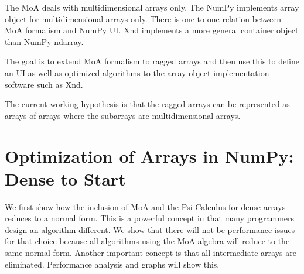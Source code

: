 \documentclass[a4paper,12pt]{article}
\begin{document}
The MoA deals with multidimensional arrays only.  The NumPy implements
array object for multidimensional arrays only. There is one-to-one
relation between MoA formalism and NumPy UI. Xnd implements a more
general container object than NumPy ndarray.

The goal is to extend MoA formalism to ragged arrays and then use this
to define an UI as well as optimized algorithms to the array object
implementation software such as Xnd. 

The current working hypothesis is that the ragged arrays can be
represented as arrays of arrays where the subarrays are
multidimensional arrays.

\section{Optimization of Arrays in NumPy: Dense to Start}
We first show how the inclusion of MoA and the Psi Calculus for dense arrays
reduces to a normal form. This is a powerful concept in that many programmers design an algorithm different. We show that there will not be performance issues for that choice because all algorithms using the MoA algebra will reduce to the same normal form. Another important concept is that all intermediate arrays are eliminated. Performance analysis and graphs will show this.
\end{document}
